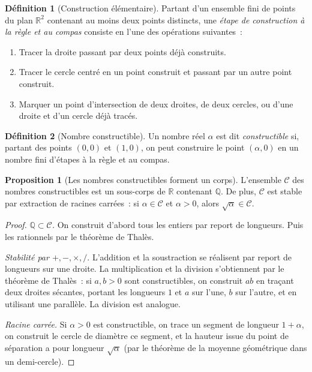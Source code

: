 \documentclass[12pt,a4paper,openany]{book}
\theoremstyle{definition}
\newtheorem{definition}{Définition}[chapter]
\newtheorem{proposition}{Proposition}[chapter]
\newcommand{\Q}{\mathbb{Q}}
\newcommand{\R}{\mathbb{R}}
\begin{document}
\begin{definition}[Construction élémentaire]\label{def:construction-elementaire}
Partant d'un ensemble fini de points du plan $\R^2$ contenant au moins deux
points distincts, une \emph{étape de construction à la règle et au compas}
consiste en l'une des opérations suivantes~:
\begin{enumerate}[label=(\roman*)]
  \item Tracer la droite passant par deux points déjà construits.
  \item Tracer le cercle centré en un point construit et passant par un
    autre point construit.
  \item Marquer un point d'intersection de deux droites, de deux cercles,
    ou d'une droite et d'un cercle déjà tracés.
\end{enumerate}
\end{definition}

\begin{definition}[Nombre constructible]\label{def:nombre-constructible}
Un nombre réel $\alpha$ est dit \emph{constructible} si, partant des points
$(0,0)$ et $(1,0)$, on peut construire le point $(\alpha, 0)$ en un nombre
fini d'étapes à la règle et au compas.
\end{definition}

\begin{proposition}[Les nombres constructibles forment un corps]\label{prop:constructibles-corps}
L'ensemble $\mathcal{C}$ des nombres constructibles est un sous-corps de $\R$
contenant $\Q$. De plus, $\mathcal{C}$ est stable par extraction de racines
carrées~: si $\alpha \in \mathcal{C}$ et $\alpha > 0$, alors
$\sqrt{\alpha} \in \mathcal{C}$.
\end{proposition}

\begin{proof}
\emph{$\Q \subset \mathcal{C}$.} On construit d'abord tous les entiers par
report de longueurs. Puis les rationnels par le théorème de Thalès.

\emph{Stabilité par $+, -, \times, /$}. L'addition et la soustraction se
réalisent par report de longueurs sur une droite. La multiplication et la
division s'obtiennent par le théorème de Thalès~: si $a, b > 0$ sont
constructibles, on construit $ab$ en traçant deux droites sécantes, portant
les longueurs $1$ et $a$ sur l'une, $b$ sur l'autre, et en utilisant une
parallèle. La division est analogue.

\emph{Racine carrée.} Si $\alpha > 0$ est constructible, on trace un
segment de longueur $1 + \alpha$, on construit le cercle de diamètre
ce segment, et la hauteur issue du point de séparation a pour longueur
$\sqrt{\alpha}$ (par le théorème de la moyenne géométrique
dans un demi-cercle).
\end{proof}
\end{document}
